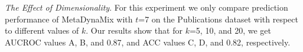 \textit{The Effect of Dimensionality}. For this experiment we only compare prediction performance of MetaDynaMix with $t$=7 on the Publications dataset with respect to different values of $k$. Our results show that for $k$=5, 10, and 20, we get AUCROC values %
 A, B, and 0.87, and ACC values C, D, and 0.82, respectively.
 
 

